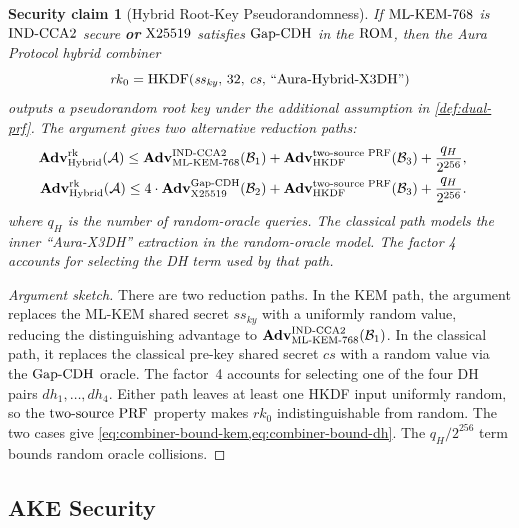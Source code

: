 \documentclass[preprint,12pt]{elsarticle}
\newtheorem{securityclaim}[theorem]{Security claim}
\theoremstyle{definition}
\newcommand{\tech}[1]{\textnormal{#1}}
\newcommand{\domain}[1]{\textnormal{``#1''}}
\renewcommand{\mathsf}[1]{\mathrm{#1}}
\newcommand{\adv}{\mathbf{Adv}}
\newcommand{\advA}{\mathcal{A}}
\newcommand{\advB}{\mathcal{B}}
\newcommand{\HKDF}{\tech{HKDF}}
\renewcommand{\DH}{\tech{X25519}}
\newcommand{\KEM}{\tech{ML-KEM-768}}
\newcommand{\GapCDH}{\tech{Gap-CDH}}
\newcommand{\INDCCA}{\tech{IND-CCA2}}
\newcommand{\twoSourcePRF}{\tech{two-source PRF}}
\newcommand{\ROM}{\tech{ROM}}
\newcommand{\rk}{\mathit{rk}}
\begin{document}
\begin{securityclaim}[Hybrid Root-Key Pseudorandomness]\label{thm:hybrid-combiner}
If $\KEM$ is $\INDCCA$ secure \textbf{or} $\DH$ satisfies $\GapCDH$ in the $\ROM$, then the Aura Protocol hybrid combiner
\begin{equation}\label{eq:combiner-root}
  \rk_0 =
  \HKDF(\mathit{ss}_{\mathit{ky}},\, 32,\,
  \mathit{cs},\, \domain{Aura-Hybrid-X3DH})
\end{equation}
outputs a pseudorandom root key under the additional assumption in
\cref{def:dual-prf}. The argument gives two alternative
reduction paths:
\begin{align}
  \begin{aligned}
  \adv^{\mathsf{rk}}_{\mathrm{Hybrid}}(\advA)
  &\leq
    \adv^{\INDCCA}_{\KEM}(\advB_1)
    + \adv^{\twoSourcePRF}_{\HKDF}(\advB_3)
    + \frac{q_H}{2^{256}},
  \end{aligned}
  \label{eq:combiner-bound-kem}\\
  \begin{aligned}
  \adv^{\mathsf{rk}}_{\mathrm{Hybrid}}(\advA)
  &\leq
    4 \cdot \adv^{\GapCDH}_{\DH}(\advB_2)
    + \adv^{\twoSourcePRF}_{\HKDF}(\advB_3)
    + \frac{q_H}{2^{256}}.
  \end{aligned}
  \label{eq:combiner-bound-dh}
\end{align}
where $q_H$ is the number of random-oracle queries. The classical path models
the inner \domain{Aura-X3DH} extraction in the random-oracle model. The factor 4
accounts for selecting the DH term used by that path.
\end{securityclaim}

\begin{proof}[Argument sketch]
There are two reduction paths. In the KEM path, the argument replaces the ML-KEM shared
secret $\mathit{ss}_{\mathit{ky}}$ with a uniformly random value, reducing
the distinguishing advantage to $\adv^{\INDCCA}_{\KEM}(\advB_1)$. In the
classical path, it replaces the classical pre-key shared secret $\mathit{cs}$ with a random
value via the $\GapCDH$ oracle. The factor~4 accounts for selecting one of the
four DH pairs $\mathit{dh}_1, \ldots, \mathit{dh}_4$. Either path leaves at
least one HKDF input uniformly random, so the $\twoSourcePRF$
property makes $\rk_0$ indistinguishable from random. The two cases give
\cref{eq:combiner-bound-kem,eq:combiner-bound-dh}. The $q_H/2^{256}$ term
bounds random oracle collisions.
\end{proof}

\subsection{AKE Security}
\end{document}
